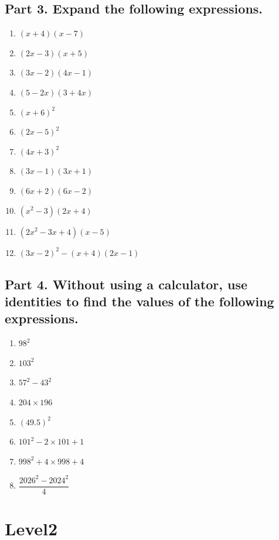 \documentclass[12pt,a4paper,]{article}
\begin{document}
	\subsection*{Part 3. Expand the following expressions.}
	\begin{enumerate}
		\item $(x+4)(x-7)$
		\item $(2x-3)(x+5)$
		\item $(3x-2)(4x-1)$
		\item $(5-2x)(3+4x)$
		\item $(x+6)^2$
		\item $(2x-5)^2$
		\item $(4x+3)^2$
		\item $(3x-1)(3x+1)$
		\item $(6x+2)(6x-2)$
		\item $(x^2-3)(2x+4)$
		\item $(2x^2-3x+4)(x-5)$
		\item $(3x-2)^2-(x+4)(2x-1)$
	\end{enumerate}
	\newpage
	\subsection*{Part 4. Without using a calculator, use identities to find the values of the following expressions.}
	\begin{enumerate}
		\item $98^2$
		\item $103^2$
		\item $57^2-43^2$
		\item $204\times196$
		\item $(49.5)^2$
		\item $101^2-2\times101+1$
		\item $998^2 + 4\times 998 +4$
		\item $\dfrac{2026^2-2024^2}{4}$
	\end{enumerate}
	\section{Level2}
\end{document}
